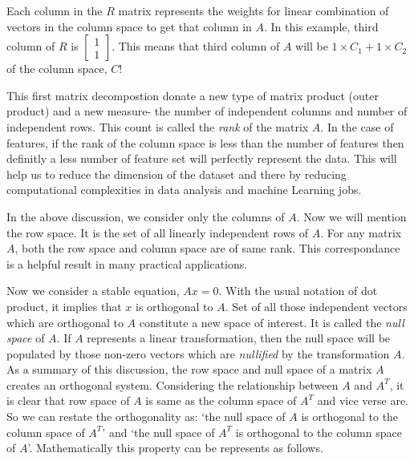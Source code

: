 \documentclass[
  letterpaper,
  DIV=11,
  numbers=noendperiod]{scrreprt}
\theoremstyle{plain}
\theoremstyle{definition}
\theoremstyle{remark}
\begin{document}
\begin{tcolorbox}
\begin{tcolorbox}
Each column in the \(R\) matrix represents the weights for linear
combination of vectors in the column space to get that column in \(A\).
In this example, third column of \(R\) is
\(\begin{bmatrix}1\\1\end{bmatrix}\). This means that third column of
\(A\) will be \(1\times C_1+1\times C_2\) of the column space, \(C\)!

\end{tcolorbox}

This first matrix decompostion donate a new type of matrix product
(outer product) and a new measure- the number of independent columns and
number of independent rows. This count is called the \emph{rank} of the
matrix \(A\). In the case of features, if the rank of the column space
is less than the number of features then definitly a less number of
feature set will perfectly represent the data. This will help us to
reduce the dimension of the dataset and there by reducing computational
complexities in data analysis and machine Learning jobs.

In the above discussion, we consider only the columns of \(A\). Now we
will mention the row space. It is the set of all linearly independent
rows of \(A\). For any matrix \(A\), both the row space and column space
are of same rank. This correspondance is a helpful result in many
practical applications.

Now we consider a stable equation, \(Ax=0\). With the usual notation of
dot product, it implies that \(x\) is orthogonal to \(A\). Set of all
those independent vectors which are orthogonal to \(A\) constitute a new
space of interest. It is called the \emph{null space} of \(A\). If \(A\)
represents a linear transformation, then the null space will be
populated by those non-zero vectors which are \emph{nullified} by the
transformation \(A\). As a summary of this discussion, the row space and
null space of a matrix \(A\) creates an orthogonal system. Considering
the relationship between \(A\) and \(A^T\), it is clear that row space
of \(A\) is same as the column space of \(A^T\) and vice verse are. So
we can restate the orthogonality as: `the null space of \(A\) is
orthogonal to the column space of \(A^T\)' and `the null space of
\(A^T\) is orthogonal to the column space of \(A\)'. Mathematically this
property can be represents as follows.

\begin{tcolorbox}[enhanced jigsaw, breakable, left=2mm, arc=.35mm, bottomtitle=1mm, leftrule=.75mm, titlerule=0mm, toprule=.15mm, opacitybacktitle=0.6, title=\textcolor{quarto-callout-note-color}{\faInfo}\hspace{0.5em}{Note}, colback=white, colframe=quarto-callout-note-color-frame, coltitle=black, bottomrule=.15mm, toptitle=1mm, rightrule=.15mm, opacityback=0, colbacktitle=quarto-callout-note-color!10!white]


\end{tcolorbox}
\end{tcolorbox}
\end{document}
